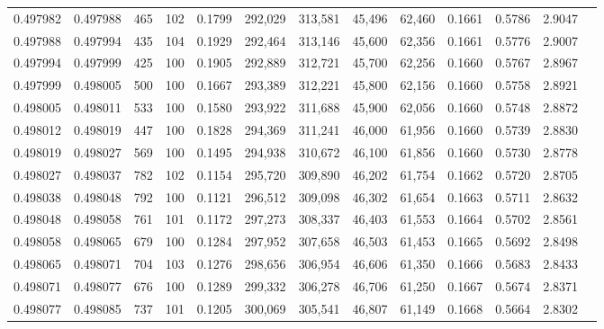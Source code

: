 \begin{tabular}{rrrrrrrrrrrrr}
0.497982 & 0.497988 &   465 & 102 &                                     0.1799 & 292,029 & 313,581 &  45,496 &  62,460 & 0.1661 & 0.5786 & 2.9047 \\
0.497988 & 0.497994 &   435 & 104 &                                     0.1929 & 292,464 & 313,146 &  45,600 &  62,356 & 0.1661 & 0.5776 & 2.9007 \\
0.497994 & 0.497999 &   425 & 100 &                                     0.1905 & 292,889 & 312,721 &  45,700 &  62,256 & 0.1660 & 0.5767 & 2.8967 \\
0.497999 & 0.498005 &   500 & 100 &                                     0.1667 & 293,389 & 312,221 &  45,800 &  62,156 & 0.1660 & 0.5758 & 2.8921 \\
0.498005 & 0.498011 &   533 & 100 &                                     0.1580 & 293,922 & 311,688 &  45,900 &  62,056 & 0.1660 & 0.5748 & 2.8872 \\
0.498012 & 0.498019 &   447 & 100 &                                     0.1828 & 294,369 & 311,241 &  46,000 &  61,956 & 0.1660 & 0.5739 & 2.8830 \\
0.498019 & 0.498027 &   569 & 100 &                                     0.1495 & 294,938 & 310,672 &  46,100 &  61,856 & 0.1660 & 0.5730 & 2.8778 \\
0.498027 & 0.498037 &   782 & 102 &                                     0.1154 & 295,720 & 309,890 &  46,202 &  61,754 & 0.1662 & 0.5720 & 2.8705 \\
0.498038 & 0.498048 &   792 & 100 &                                     0.1121 & 296,512 & 309,098 &  46,302 &  61,654 & 0.1663 & 0.5711 & 2.8632 \\
0.498048 & 0.498058 &   761 & 101 &                                     0.1172 & 297,273 & 308,337 &  46,403 &  61,553 & 0.1664 & 0.5702 & 2.8561 \\
0.498058 & 0.498065 &   679 & 100 &                                     0.1284 & 297,952 & 307,658 &  46,503 &  61,453 & 0.1665 & 0.5692 & 2.8498 \\
0.498065 & 0.498071 &   704 & 103 &                                     0.1276 & 298,656 & 306,954 &  46,606 &  61,350 & 0.1666 & 0.5683 & 2.8433 \\
0.498071 & 0.498077 &   676 & 100 &                                     0.1289 & 299,332 & 306,278 &  46,706 &  61,250 & 0.1667 & 0.5674 & 2.8371 \\
0.498077 & 0.498085 &   737 & 101 &                                     0.1205 & 300,069 & 305,541 &  46,807 &  61,149 & 0.1668 & 0.5664 & 2.8302 \\

\end{tabular}
